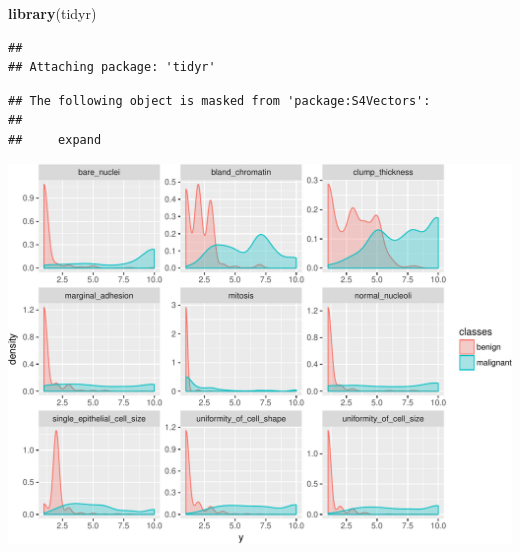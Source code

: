 \documentclass[]{article}
\newenvironment{Shaded}{\begin{snugshade}}{\end{snugshade}}
\newcommand{\KeywordTok}[1]{\textcolor[rgb]{0.13,0.29,0.53}{\textbf{{#1}}}}
\newcommand{\DataTypeTok}[1]{\textcolor[rgb]{0.13,0.29,0.53}{{#1}}}
\newcommand{\DecValTok}[1]{\textcolor[rgb]{0.00,0.00,0.81}{{#1}}}
\newcommand{\FloatTok}[1]{\textcolor[rgb]{0.00,0.00,0.81}{{#1}}}
\newcommand{\StringTok}[1]{\textcolor[rgb]{0.31,0.60,0.02}{{#1}}}
\newcommand{\NormalTok}[1]{{#1}}
\begin{document}
\begin{Shaded}
\begin{Highlighting}[]
\KeywordTok{library}\NormalTok{(tidyr)}
\end{Highlighting}
\end{Shaded}

\begin{verbatim}
## 
## Attaching package: 'tidyr'
\end{verbatim}

\begin{verbatim}
## The following object is masked from 'package:S4Vectors':
## 
##     expand
\end{verbatim}

\begin{Shaded}
\end{Shaded}

\includegraphics{webinar_code_files/figure-latex/features-1.pdf}
\end{document}
